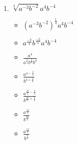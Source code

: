 \documentclass{article}
\begin{document}
\begin{onehalfspace}
\begin{enumerate}[start=41]
        \item $\sqrt[4]{a^{-3}b^{-2}}a^{4}b^{-4}$
        \begin{itemize}
            \item $\left( a^{-3}b^{-2} \right)^{\frac{1}{4}}a^{4}b^{-4}$
            \item $a^{\frac{-3}{4}}b^{\frac{-2}{4}}a^{4}b^{-4}$
            \item $\frac{a^{4}}{a^{\frac{3}{4}}b^{\frac{2}{4}} b^{4}}$
            \item $\frac{a^{4 - \frac{3}{4}}}{b^{4 + \frac{2}{4}}}$
            \item $\frac{a^{\frac{16}{4} - \frac{3}{4}}}{b^{\frac{16}{4} + \frac{2}{4}}}$
            \item $\frac{a^{\frac{13}{4}}}{b^{\frac{18}{4}}}$
            \item $\frac{a^{\frac{13}{4}}}{b^{\frac{9}{2}}}$
        \end{itemize}
     \end{enumerate}
\end{onehalfspace}
\end{document}
